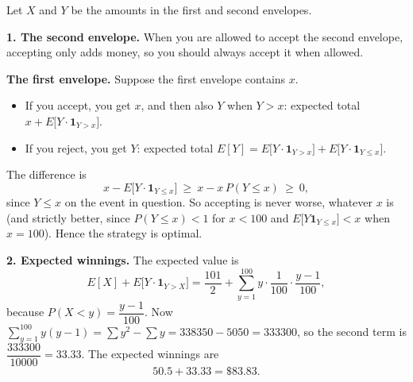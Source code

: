 Let $X$ and $Y$ be the amounts in the first and second envelopes.

\textbf{1. The second envelope.} When you are allowed to accept the second envelope, accepting only adds money, so you should always accept it when allowed.

\textbf{The first envelope.} Suppose the first envelope contains $x$.
\begin{itemize}
\item If you accept, you get $x$, and then also $Y$ when $Y>x$: expected total $x+E\big[Y\cdot\mathbf 1_{Y>x}\big]$.
\item If you reject, you get $Y$: expected total $E[Y]=E\big[Y\cdot\mathbf 1_{Y>x}\big]+E\big[Y\cdot\mathbf 1_{Y\le x}\big]$.
\end{itemize}
The difference is
\[
x-E\big[Y\cdot\mathbf 1_{Y\le x}\big]\ \ge\ x-x\,P(Y\le x)\ \ge\ 0,
\]
since $Y\le x$ on the event in question. So accepting is never worse, whatever $x$ is (and strictly better, since $P(Y\le x)<1$ for $x<100$ and $E\big[Y\mathbf 1_{Y\le x}\big]<x$ when $x=100$). Hence the strategy is optimal.

\textbf{2. Expected winnings.} The expected value is
\[
E[X]+E\big[Y\cdot\mathbf 1_{Y>X}\big]=\dfrac{101}{2}+\sum_{y=1}^{100}y\cdot\dfrac{1}{100}\cdot\dfrac{y-1}{100},
\]
because $P(X<y)=\dfrac{y-1}{100}$. Now $\sum_{y=1}^{100}y(y-1)=\sum y^2-\sum y=338350-5050=333300$, so the second term is $\dfrac{333300}{10000}=33.33$. The expected winnings are
\[
50.5+33.33=\boxed{\$83.83}.
\]
